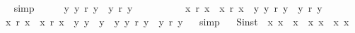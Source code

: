 \begin{isabellebody}
\ %
\endisadelimproof
%
\isatagproof
{}\isamarkupfalse%
\ simp%
\endisatagproof
{\isafoldproof}%
%
\isadelimproof
%
\endisadelimproof
\ \ \isanewline
\ \isanewline
{}\isamarkupfalse%
\ {\isachardoublequoteopen}\isactrlbold {\isasymexists}y{\isachardot}\ y\ \isactrlbold r\ y\ \isactrlbold {\isasymrightarrow}\ y\ \isactrlbold r\ y{\isachardoublequoteclose}\ \isamarkupfalse%
%
\isadelimproof
\ %
\endisadelimproof
%
\isatagproof
{}\isamarkupfalse%
%
\endisatagproof
{\isafoldproof}%
%
\isadelimproof
%
\endisadelimproof
\ \ \ \ \isanewline
\ \isanewline
{}\isamarkupfalse%
\ {\isachardoublequoteopen}{\isacharparenleft}x\ \isactrlbold r\ x\ \isactrlbold {\isasymrightarrow}\ x\ \isactrlbold r\ x{\isacharparenright}\ \isactrlbold {\isasymrightarrow}\ {\isacharparenleft}\isactrlbold {\isasymexists}y{\isachardot}\ y\ \isactrlbold r\ y\ \isactrlbold {\isasymrightarrow}\ y\ \isactrlbold r\ y{\isacharparenright}{\isachardoublequoteclose}\ \isamarkupfalse%
%
\isadelimproof
\ %
\endisadelimproof
%
\isatagproof
{}\isamarkupfalse%
%
\endisatagproof
{\isafoldproof}%
%
\isadelimproof
%
\endisadelimproof
\isanewline
\ \isanewline
{}\isamarkupfalse%
\ {\isachardoublequoteopen}{\isacharparenleft}{\isacharparenleft}x\ \isactrlbold r\ x\ \isactrlbold {\isasymrightarrow}\ x\ \isactrlbold r\ x{\isacharparenright}\ \isactrlbold {\isasymand}\ {\isacharparenleft}\isactrlbold {\isasymexists}y{\isacharcolon}{\isacharcolon}{\isasymiota}{\isachardot}\ y\ \isactrlbold {\isacharequal}\ y{\isacharparenright}{\isacharparenright}\ \isactrlbold {\isasymrightarrow}\ {\isacharparenleft}\isactrlbold {\isasymexists}y{\isachardot}\ y\ \isactrlbold r\ y\ \isactrlbold {\isasymrightarrow}\ y\ \isactrlbold r\ y{\isacharparenright}{\isachardoublequoteclose}%
\isadelimproof
\ %
\endisadelimproof
%
\isatagproof
{}\isamarkupfalse%
\ simp\isanewline
\ \isanewline
\isanewline
\isanewline
%
%
\endisatagproof
{\isafoldproof}%
%
\isadelimproof
%
\endisadelimproof
\isanewline
{}\isamarkupfalse%
\ S{}{\isacharunderscore}inst\ {\isacharcolon}\ {\isachardoublequoteopen}{\isacharparenleft}\isactrlbold {\isasymforall}x{\isachardot}\ {\isasymPhi}{\isacharparenleft}x{\isacharparenright}\ \isactrlbold {\isasymrightarrow}\ {\isasymPsi}{\isacharparenleft}x{\isacharparenright}{\isacharparenright}\ \isactrlbold {\isasymrightarrow}\ {\isacharparenleft}{\isacharparenleft}\isactrlbold {\isasymforall}x{\isachardot}\ {\isasymPhi}{\isacharparenleft}x{\isacharparenright}{\isacharparenright}\ \isactrlbold {\isasymrightarrow}\ {\isacharparenleft}\isactrlbold {\isasymforall}x{\isachardot}\ {\isasymPsi}{\isacharparenleft}x{\isacharparenright}{\isacharparenright}{\isacharparenright}{\isachardoublequoteclose}%

\end{isabellebody}
